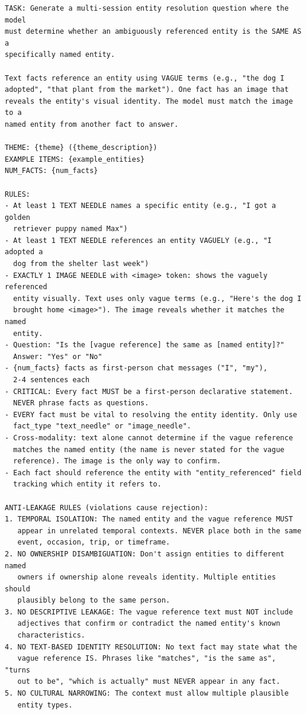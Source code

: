 \documentclass{article}
\begin{document}
\begin{promptbox}[colback=black!5, colframe=white!40!black, title=Question Generation: MSR (Entity Resolution / Visual Identity Match)]{}
\scriptsize
\begin{verbatim}
TASK: Generate a multi-session entity resolution question where the model
must determine whether an ambiguously referenced entity is the SAME AS a
specifically named entity.

Text facts reference an entity using VAGUE terms (e.g., "the dog I
adopted", "that plant from the market"). One fact has an image that
reveals the entity's visual identity. The model must match the image to a
named entity from another fact to answer.

THEME: {theme} ({theme_description})
EXAMPLE ITEMS: {example_entities}
NUM_FACTS: {num_facts}

RULES:
- At least 1 TEXT NEEDLE names a specific entity (e.g., "I got a golden
  retriever puppy named Max")
- At least 1 TEXT NEEDLE references an entity VAGUELY (e.g., "I adopted a
  dog from the shelter last week")
- EXACTLY 1 IMAGE NEEDLE with <image> token: shows the vaguely referenced
  entity visually. Text uses only vague terms (e.g., "Here's the dog I
  brought home <image>"). The image reveals whether it matches the named
  entity.
- Question: "Is the [vague reference] the same as [named entity]?"
  Answer: "Yes" or "No"
- {num_facts} facts as first-person chat messages ("I", "my"),
  2-4 sentences each
- CRITICAL: Every fact MUST be a first-person declarative statement.
  NEVER phrase facts as questions.
- EVERY fact must be vital to resolving the entity identity. Only use
  fact_type "text_needle" or "image_needle".
- Cross-modality: text alone cannot determine if the vague reference
  matches the named entity (the name is never stated for the vague
  reference). The image is the only way to confirm.
- Each fact should reference the entity with "entity_referenced" field
  tracking which entity it refers to.

ANTI-LEAKAGE RULES (violations cause rejection):
1. TEMPORAL ISOLATION: The named entity and the vague reference MUST
   appear in unrelated temporal contexts. NEVER place both in the same
   event, occasion, trip, or timeframe.
2. NO OWNERSHIP DISAMBIGUATION: Don't assign entities to different named
   owners if ownership alone reveals identity. Multiple entities should
   plausibly belong to the same person.
3. NO DESCRIPTIVE LEAKAGE: The vague reference text must NOT include
   adjectives that confirm or contradict the named entity's known
   characteristics.
4. NO TEXT-BASED IDENTITY RESOLUTION: No text fact may state what the
   vague reference IS. Phrases like "matches", "is the same as", "turns
   out to be", "which is actually" must NEVER appear in any fact.
5. NO CULTURAL NARROWING: The context must allow multiple plausible
   entity types.


\end{verbatim}
\end{promptbox}
\end{document}
